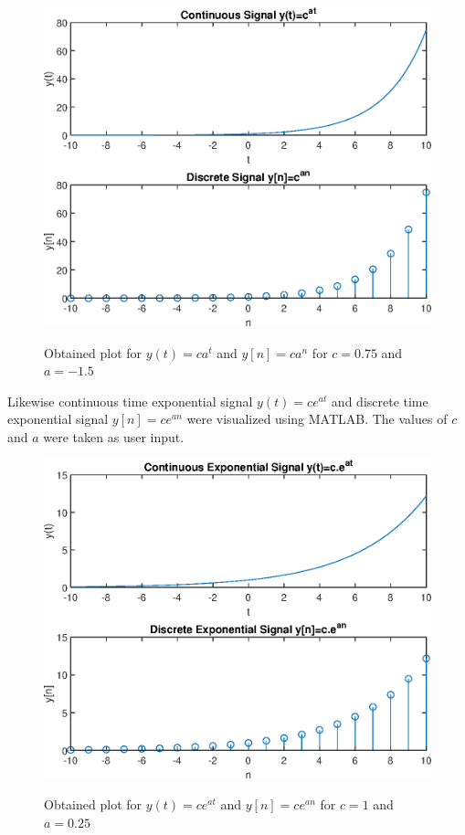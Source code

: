 \documentclass{lab_sheet}
\begin{document}
    \begin{figure}[H]
        \centering
        \includegraphics[scale=0.6]{./Figures/powered_2}
        \label{fig:power2}
        \caption{Obtained plot for $y(t)=ca^t$ and $y[n]=ca^n$ for $c=0.75$ and $a=-1.5$}
    \end{figure}

    Likewise continuous time exponential signal $y(t)=ce^{at}$ and discrete time exponential signal $y[n]=ce^{an}$ were visualized using MATLAB. The values of $c$ and $a$ were taken as user input.
    \begin{figure}[H]
        \centering
        \includegraphics[scale=0.6]{./Figures/exp_signal_1}
        \label{fig:exp1}
        \caption{Obtained plot for $y(t)=ce^{at}$ and $y[n]=ce^{an}$ for $c=1$ and $a=0.25$}
    \end{figure}
\end{document}
